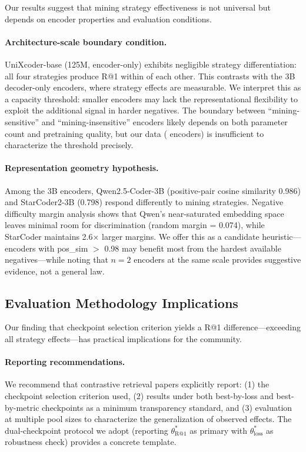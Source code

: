 Our results suggest that mining strategy effectiveness is not universal but depends on encoder properties and evaluation conditions.

\paragraph{Architecture-scale boundary condition.}
UniXcoder-base (125M, encoder-only) exhibits negligible strategy differentiation: all four strategies produce R@1 within  of each other.
This contrasts with the 3B decoder-only encoders, where strategy effects are measurable.
We interpret this as a capacity threshold: smaller encoders may lack the representational flexibility to exploit the additional signal in harder negatives.
The boundary between ``mining-sensitive'' and ``mining-insensitive'' encoders likely depends on both parameter count and pretraining quality, but our data ( encoders) is insufficient to characterize the threshold precisely.

\paragraph{Representation geometry hypothesis.}
Among the 3B encoders, Qwen2.5-Coder-3B (positive-pair cosine similarity 0.986) and StarCoder2-3B (0.798) respond differently to mining strategies.
Negative difficulty margin analysis shows that Qwen's near-saturated embedding space leaves minimal room for discrimination (random margin = 0.074), while StarCoder maintains 2.6$\times$ larger margins.
We offer this as a candidate heuristic---encoders with pos\_sim $>$ 0.98 may benefit most from the hardest available negatives---while noting that $n{=}2$ encoders at the same scale provides suggestive evidence, not a general law.

\subsection{Evaluation Methodology Implications}
\label{sec:discuss-eval}

Our finding that checkpoint selection criterion yields a  R@1 difference---exceeding all strategy effects---has practical implications for the community.

\paragraph{Reporting recommendations.}
We recommend that contrastive retrieval papers explicitly report: (1) the checkpoint selection criterion used, (2) results under both best-by-loss and best-by-metric checkpoints as a minimum transparency standard, and (3) evaluation at multiple pool sizes to characterize the generalization of observed effects.
The dual-checkpoint protocol we adopt (reporting $\theta^*_{\text{R@1}}$ as primary with $\theta^*_{\text{loss}}$ as robustness check) provides a concrete template.

